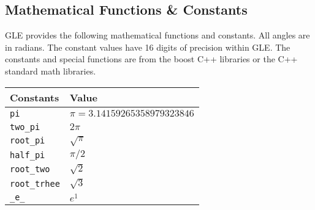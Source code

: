 \subsection{Mathematical Functions \& Constants}

GLE provides the following mathematical functions and constants.  All angles are in radians. The constant values have 16 digits of precision within GLE.  The constants and special functions are from the boost C++ libraries or the C++ standard math libraries.

\begin{supertabular}{ll} \hline
Constants & Value  \\ \hline
{\tt pi}       & $\pi = 3.14159265358979323846 $ \\
{\tt two\_pi}   & $2\pi $ \\
{\tt root\_pi}  & $\sqrt{\pi}$ \\
{\tt half\_pi}   & $\pi/2$ \\
{\tt root\_two}   & $\sqrt{2}$ \\
{\tt root\_trhee}   & $\sqrt{3}$ \\
{\tt \_e\_}      & $e^1$ \\
\end{supertabular}



